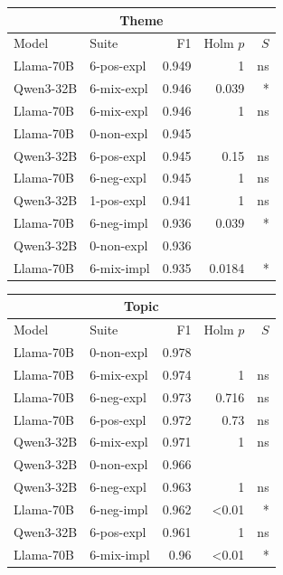 \begin{table}
    \centering
    \scriptsize
    \begin{tabular}{ll|rrr}
    \toprule
    \multicolumn{5}{c}{\textbf{Theme}} \\
    \midrule
    Model & Suite & F1 & Holm $p$ & $S$ \\
    \midrule
    Llama-70B & 6-pos-expl & 0.949 & 1 & ns \\
    Qwen3-32B & 6-mix-expl & 0.946 & 0.039 & * \\
    Llama-70B & 6-mix-expl & 0.946 & 1 & ns \\
    Llama-70B & 0-non-expl & 0.945 &  &  \\
    Qwen3-32B & 6-pos-expl & 0.945 & 0.15 & ns \\
    Llama-70B & 6-neg-expl & 0.945 & 1 & ns \\
    Qwen3-32B & 1-pos-expl & 0.941 & 1 & ns \\
    Llama-70B & 6-neg-impl & 0.936 & 0.039 & * \\
    Qwen3-32B & 0-non-expl & 0.936 &  &  \\
    Llama-70B & 6-mix-impl & 0.935 & 0.0184 & * \\
    \bottomrule
    \end{tabular}
    \begin{tabular}{ll|rrr}
    \toprule
    \multicolumn{5}{c}{\textbf{Topic}} \\
    \midrule
    Model & Suite & F1 & Holm $p$ & $S$ \\
    \midrule
    Llama-70B & 0-non-expl & 0.978 &  &  \\
    Llama-70B & 6-mix-expl & 0.974 & 1 & ns \\
    Llama-70B & 6-neg-expl & 0.973 & 0.716 & ns \\
    Llama-70B & 6-pos-expl & 0.972 & 0.73 & ns \\
    Qwen3-32B & 6-mix-expl & 0.971 & 1 & ns \\
    Qwen3-32B & 0-non-expl & 0.966 &  &  \\
    Qwen3-32B & 6-neg-expl & 0.963 & 1 & ns \\
    Llama-70B & 6-neg-impl & 0.962 & <0.01 & * \\
    Qwen3-32B & 6-pos-expl & 0.961 & 1 & ns \\
    Llama-70B & 6-mix-impl & 0.96 & <0.01 & * \\
    \bottomrule
    \end{tabular}


\end{table}
